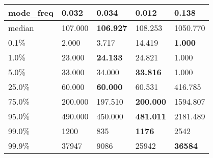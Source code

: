\begin{table}[H]
\begin{tabular}{|l|m{10em}|m{10em}|m{10em}|m{10em}|}
\hline mode\_freq & 0.032 & \bfseries 0.034 & 0.012 & \cellcolor[rgb]{0.9, 0.54, 0.52} 0.138 \\
\hline median & 107.000 & \bfseries 106.927 & 108.253 & \cellcolor[rgb]{0.9, 0.54, 0.52} 1050.770 \\
\hline 0.1\% & 2.000 & 3.717 & \cellcolor[rgb]{0.9, 0.54, 0.52} 14.419 & \bfseries 1.000 \\
\hline 1.0\% & 23.000 & \bfseries 24.133 & 24.821 & \cellcolor[rgb]{0.9, 0.54, 0.52} 1.000 \\
\hline 5.0\% & 33.000 & 34.000 & \bfseries 33.816 & \cellcolor[rgb]{0.9, 0.54, 0.52} 1.000 \\
\hline 25.0\% & 60.000 & \bfseries 60.000 & 60.531 & \cellcolor[rgb]{0.9, 0.54, 0.52} 416.785 \\
\hline 75.0\% & 200.000 & 197.510 & \bfseries 200.000 & \cellcolor[rgb]{0.9, 0.54, 0.52} 1594.807 \\
\hline 95.0\% & 490.000 & 450.000 & \bfseries 481.011 & \cellcolor[rgb]{0.9, 0.54, 0.52} 2181.489 \\
\hline 99.0\% & 1200 & 835 & \bfseries 1176 & \cellcolor[rgb]{0.9, 0.54, 0.52} 2542 \\
\hline 99.9\% & 37947 & \cellcolor[rgb]{0.9, 0.54, 0.52} 9086 & 25942 & \bfseries 36584 \\
\hline
\end{tabular}
\end{table}
